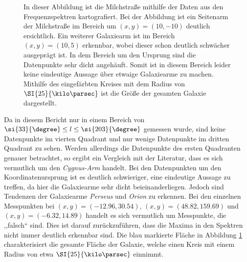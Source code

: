 \begin{figure}[H]
    \centering
       
    \caption[Abbildung der Milchstraße]{In dieser Abbildung ist die Milchstraße mithilfe der Daten aus den Frequenzspektren kartografiert. Bei der Abbildung ist ein Seitenarm der Milchstraße im Bereich um $(x,y)=(10,-10)$ deutlich ersichtlich. Ein weiterer Galaxiearm ist im Bereich $(x,y)=(10,5)$ erkennbar, wobei dieser schon deutlich schwächer ausgeprägt ist. In dem Bereich um den Ursprung sind die Datenpunkte sehr dicht angehäuft. Somit ist in diesem Bereich leider keine eindeutige Aussage über etwaige Galaxiearme zu machen. Mithilfe des eingefärbten Kreises mit dem Radius von $\SI{25}{\kilo \parsec}$ ist die Größe der gesamten Galaxie dargestellt.}
    \label{fig:Milchstrassesafe}
\end{figure}
\newpage
Da in diesem Bericht nur in einem Bereich von $\si{33}{\degree} \le l \le \si{203}{\degree}$ gemessen wurde, sind keine Datenpunkte im vierten Quadrant und nur wenige Datenpunkte im dritten Quadrant zu sehen.
Werden allerdings die Datenpunkte des ersten Quadranten genauer betrachtet, so ergibt ein Vergleich mit der Literatur, dass es sich vermutlich um den \textit{Cygnus-Arm} handelt. Bei den Datenpunkten um den Koordinatenursprung ist es deutlich schwieriger, eine eindeutige Aussage zu treffen, da hier die Galaxiearme sehr dicht beieinanderliegen. Jedoch sind Tendenzen der Galaxiearme \textit{Perseus} und \textit{Orion} zu erkennen. Bei den einzelnen Messpunkten bei $(x,y)=(-12.96, 30.54)$, $(x,y)=(48.82, 159.69)$ und $(x,y)=(-6.32, 14.89)$ handelt es sich vermutlich um Messpunkte, die ,,falsch`` sind. Dies ist darauf zurückzuführen, dass die Maxima in den Spektren nicht immer deutlich erkennbar sind. Die blau markierte Fläche in Abbildung \ref{fig:Milchstrassesafe} charakterisiert die gesamte Fläche der Galaxie, welche einen Kreis mit einem Radius von etwa $\SI{25}{\kilo \parsec}$ einnimmt.

